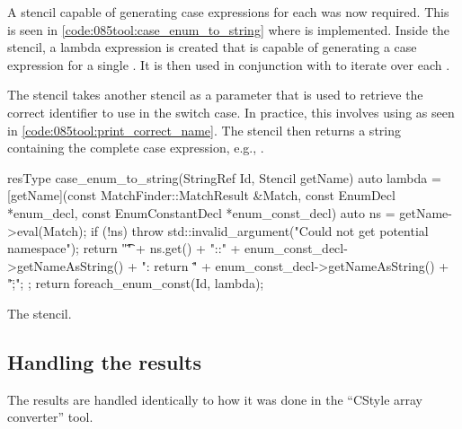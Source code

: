 A stencil capable of generating case expressions for each  was now required. This is seen in \cref{code:085tool:case_enum_to_string} where  is implemented.
Inside the stencil, a lambda expression is created that is capable of generating a case expression for a single . It is then used in conjunction with  to iterate over each .

The stencil takes another stencil as a parameter that is used to retrieve the correct identifier to use in the switch case. In practice, this involves using  as seen in \cref{code:085tool:print_correct_name}.
The stencil then returns a string containing the complete case expression, e.g., .

\begin{listing}[H]
    \begin{cppcode}
resType case_enum_to_string(StringRef Id, Stencil getName) {
	auto lambda = [getName](const MatchFinder::MatchResult &Match, const EnumDecl *enum_decl,
					   const EnumConstantDecl *enum_const_decl) {
			auto ns = getName->eval(Match);
			if (!ns) {
				throw std::invalid_argument("Could not get potential namespace");
			}
			return "\t\tcase " + ns.get() +
				   "::" + enum_const_decl->getNameAsString() + ": return \"" +
				   enum_const_decl->getNameAsString() + "\";\n";
		};
	return foreach_enum_const(Id, lambda);
}
    \end{cppcode}
    \caption{The  stencil.}
    \label{code:085tool:case_enum_to_string}
\end{listing}

\subsection{Handling the results}
The results are handled identically to how it was done in the ``CStyle array converter'' tool.